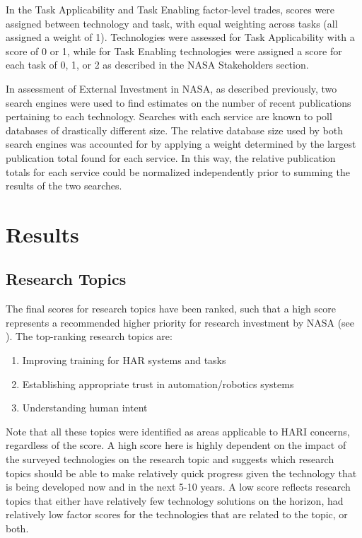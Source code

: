 In the Task Applicability and Task Enabling factor-level trades, scores were assigned between technology and task, with equal weighting across tasks (all assigned a weight of 1).
Technologies were assessed for Task Applicability with a score of 0 or 1, while for Task Enabling technologies were assigned a score for each task of 0, 1, or 2 as described in the NASA Stakeholders section.

In assessment of External Investment in NASA, as described previously, two search engines were used to find estimates on the number of recent publications pertaining to each technology.
Searches with each service are known to poll databases of drastically different size.
The relative database size used by both search engines was accounted for by applying a weight determined by the largest publication total found for each service.
In this way, the relative publication totals for each service could be normalized independently prior to summing the results of the two searches.

\section{Results}

\subsection{Research Topics}
The final scores for research topics have been ranked, such that a high score represents a recommended higher priority for research investment by NASA (see ).
The top-ranking research topics are:
\begin{enumerate}
    \item Improving training for HAR systems and tasks
    \item Establishing appropriate trust in automation/robotics systems
    \item Understanding human intent
\end{enumerate}

Note that all these topics were identified as areas applicable to HARI concerns, regardless of the score.
A high score here is highly dependent on the impact of the surveyed technologies on the research topic and suggests which research topics should be able to make relatively quick progress given the technology that is being developed now and in the next 5-10 years.
A low score reflects research topics that either have relatively few technology solutions on the horizon, had relatively low factor scores for the technologies that are related to the topic, or both.

